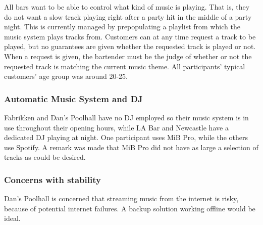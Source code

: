 
All bars want to be able to control what kind of music is playing. That is, they do not want a slow track playing right after a party hit in the middle of a party night. This is currently managed by prepopulating a playlist from which the music system plays tracks from. Customers can at any time request a track to be played, but no guarantees are given whether the requested track is played or not. When a request is given, the bartender must be the judge of whether or not the requested track is matching the current music theme. All participants' typical customers' age group was around 20-25.

\subsubsection{Automatic Music System and DJ}
\label{sub:differences}
Fabrikken and Dan's Poolhall have no DJ employed so their music system is in use throughout their opening hours, while LA Bar and Newcastle have a dedicated DJ playing at night. One participant uses MiB Pro, while the others use Spotify. A remark was made that MiB Pro did not have as large a selection of tracks as could be desired.

\subsubsection{Concerns with stability}
\label{sub:specific_remarks}

Dan's Poolhall is concerned that streaming music from the internet is risky, because of potential internet failures. A backup solution working offline would be ideal.






